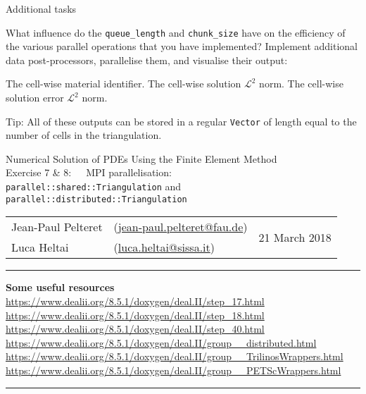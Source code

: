\documentclass[11pt,answers]{exam}
\makeatletter
\newcommand{\makeheader}[3]{%
\setcounter{question}{0}
\begin{center}
{\sc Numerical Solution of PDEs Using the Finite Element Method}\vspace{2ex}\\
{\sc Exercise #1:\ \ \ #2}\vspace{2ex}\\
\begin{tabular*}{\textwidth}{ll @{\extracolsep{\fill}}r}
Jean-Paul Pelteret & (\url{jean-paul.pelteret@fau.de}) & \multirow{2}{*}{#3} \\
Luca Heltai & (\url{luca.heltai@sissa.it}) & \\
\end{tabular*}
\end{center}
}
\newcommand{\makeresources}[1]{%
\rule{\textwidth}{0.6mm}
\textbf{Some useful resources}\\[1.5ex]
#1 \par
\rule{\textwidth}{0.6mm}
}
\makeatother
\begin{document}
\begin{questions}
\question Additional tasks
\begin{parts}
\bonuspart What influence do the \verb|queue_length| and \verb|chunk_size| have on the efficiency of the various parallel operations that you have implemented?
\bonuspart Implement additional data post-processors, parallelise them, and visualise their output:
\begin{subparts}
\subpart The cell-wise material identifier.
\subpart The cell-wise solution $\mathcal{L}^{2}$ norm. %
\subpart The cell-wise solution error $\mathcal{L}^{2}$ norm.
\end{subparts}
Tip: All of these outputs can be stored in a regular \verb|Vector| of length equal to the number of cells in the triangulation.
\end{parts}

\end{questions}




\clearpage
\makeheader{7 \& 8}{MPI parallelisation: \\\texttt{parallel::shared::Triangulation} and \texttt{parallel::distributed::Triangulation}}{21 March 2018}
\makeresources{%
\url{https://www.dealii.org/8.5.1/doxygen/deal.II/step_17.html} \\
\url{https://www.dealii.org/8.5.1/doxygen/deal.II/step_18.html} \\
\url{https://www.dealii.org/8.5.1/doxygen/deal.II/step_40.html} \\
\url{https://www.dealii.org/8.5.1/doxygen/deal.II/group__distributed.html} \\
\url{https://www.dealii.org/8.5.1/doxygen/deal.II/group__TrilinosWrappers.html} \\
\url{https://www.dealii.org/8.5.1/doxygen/deal.II/group__PETScWrappers.html}
}




\end{document}
